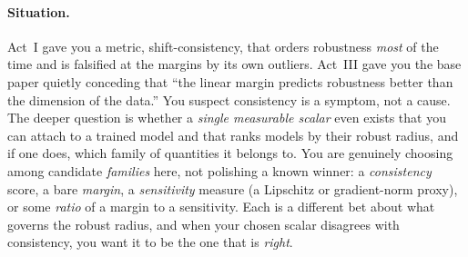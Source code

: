 \paragraph{Situation.} Act~I gave you a metric, shift-consistency, that orders robustness
\emph{most} of the time and is falsified at the margins by its own outliers. Act~III gave you the
base paper quietly conceding that ``the linear margin predicts robustness better than the dimension
of the data.'' You suspect consistency is a symptom, not a cause. The deeper question is whether a
\emph{single measurable scalar} even exists that you can attach to a trained model and that ranks
models by their robust radius, and if one does, which family of quantities it belongs to. You are
genuinely choosing among candidate \emph{families} here, not polishing a known winner: a
\emph{consistency} score, a bare \emph{margin}, a \emph{sensitivity} measure (a Lipschitz or
gradient-norm proxy), or some \emph{ratio} of a margin to a sensitivity. Each is a different bet
about what governs the robust radius, and when your chosen scalar disagrees with consistency, you
want it to be the one that is \emph{right}.

